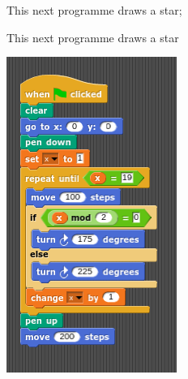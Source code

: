 \documentclass[11pt,a4paper]{scrartcl}
\begin{document}
This next programme draws a star;

This next programme draws a star
\begin{center}
\includegraphics{star.png}
\end{center}
\end{document}
